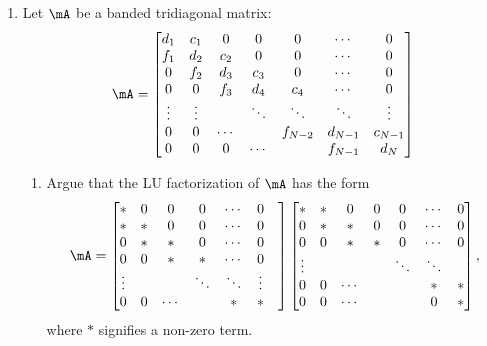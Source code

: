 \documentclass[11pt]{article}
\begin{document}
\begin{enumerate}
\vspace{4mm} 
\item  Let $\mA$ be a banded tridiagonal matrix:
\[
	\mA = 
	\begin{bmatrix}
		d_1 & c_1 & 0 & 0 & 0 & \cdots & 0 \\
		f_1 & d_2 & c_2 & 0 & 0 & \cdots & 0 \\
		0 & f_2 & d_3 & c_3 & 0 & \cdots & 0 \\
		0 & 0 & f_3 & d_4 & c_4 & \cdots & 0 \\
		\vdots & \vdots & & \ddots & \ddots & \ddots & \vdots \\
		0 & 0 & \cdots & & f_{N-2} & d_{N-1} & c_{N-1} \\
		0 & 0 & 0 & \cdots & & f_{N-1} & d_N
	\end{bmatrix}
\]
\begin{enumerate}
	\item Argue that the LU factorization of $\mA$ has the form
	\[
		\mA = 
		\begin{bmatrix}
			* & 0 & 0 & 0 & \cdots & 0 \\
			* & * & 0 & 0 & \cdots & 0 \\
			0 & * & * & 0 & \cdots & 0 \\
			0 & 0 & * & * & \cdots & 0 \\
			\vdots & & & \ddots & \ddots & \vdots  & \\
			0 & 0 & \cdots & & * & *  
		\end{bmatrix}
		\begin{bmatrix}
			* & * & 0 & 0 & 0 & \cdots & 0 \\
			0 & * & * & 0 & 0 & \cdots & 0 \\
			0 & 0 & * & * & 0 & \cdots & 0 \\
			\vdots & & & & \ddots & \ddots \\
			0 & 0 & \cdots  & & &  * & * \\
			0 & 0 &  \cdots & & & 0 & *
		\end{bmatrix},
	\]
	where $*$ signifies a non-zero term.
	

\end{enumerate}
\end{enumerate}
\end{document}
